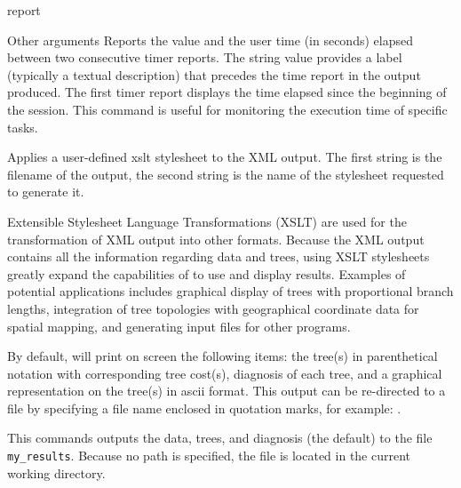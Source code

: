 \begin{command}{report}{}
\begin{arguments}
\begin{argumentgroup}{Other arguments}
                {Reports the value and the user time (in seconds) elapsed between
                two consecutive timer reports. The string value provides a label
                (typically a textual description) that precedes the time report
                in the output produced.
                The first timer report displays the time elapsed since the beginning of the
                \poy session. This command is useful for monitoring the execution time
                of specific tasks.}
                {}
                
	     {Applies a user-defined xslt stylesheet to the XML output. The first string is
	     the filename of the output, the second string is the name of the stylesheet
	     requested to generate it.}
	     {}
	     
	     \begin{statement}
	     Extensible Stylesheet Language Transformations (XSLT) are used
	     for the transformation of XML output into other formats. Because the XML output contains all the information regarding data and trees, using XSLT stylesheets greatly expand the capabilities of \poy to use and display results.
	     Examples of potential applications includes graphical display of trees with proportional branch lengths,
	     integration of tree topologies with geographical coordinate data for spatial mapping, and
	     generating input files for other programs.
	     \end{statement}
	     
	     \end{argumentgroup}
	\end{arguments}

        {By default, \poy will print on screen the following items: the tree(s)
        in parenthetical notation with corresponding tree cost(s), diagnosis of
        each tree, and a graphical representation on the tree(s) in ascii
        format. This output can be re-directed to a file by specifying a file
        name enclosed in quotation marks, for example:
        .}

	\begin{poyexamples} 

		{This commands outputs the data, trees, and diagnosis (the default) to the
		file \texttt{my\_results}. Because no path is specified, the
		file is located in the current working directory.}
		

\end{poyexamples}
\end{command}

